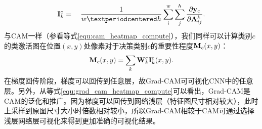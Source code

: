 \begin{equation}
\ve{I}_{k}^{c}=\quad \frac{1}{w·h} \sum_{i}^{w} \sum_{j}^{h} \frac{\partial \ve{y}_{c}}{\partial \ve{A}_{i j}^{k}}.
\end{equation}
与CAM一样（参看等式\ref{equ:cam_heatmap_compute}），我们同样可以计算类别$c$的类激活图在位置$(x,y)$处像素对于决策类别$c$的重要性程度$\mathbf{M}_c(x, y)$：
\begin{equation}\label{equ:grad_cam_heatmap_compute}
\mathbf{M}_{c}(x, y)=\sum_{k} \mathbf{W}_{k}^{c} \mathbf{I}_{k}^c(x, y).
\end{equation}
在梯度回传阶段，梯度可以回传到任意层，故Grad-CAM可可视化CNN中的任意层。另外，从等式\ref{equ:grad_cam_heatmap_compute}可以看出，Grad-CAM是CAM的泛化和推广。因为梯度可以回传到网络浅层（特征图尺寸相对较大），此时上采样到原图尺寸大小时倍数相对较小，所以Grad-CAM相较于CAM可通过选择浅层网络层可视化来得到更加准确的可视化结果。
